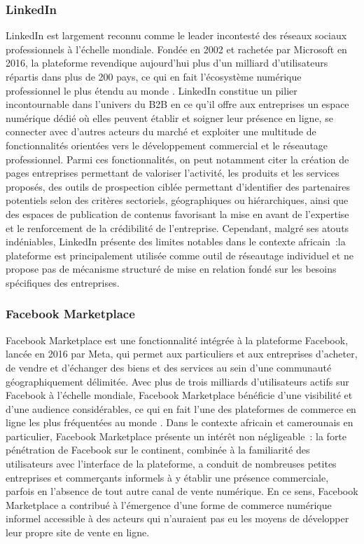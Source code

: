 \documentclass[12pt, a4paper, oneside]{report}
\begin{document}
\subsubsection{LinkedIn}

LinkedIn est largement reconnu comme le leader incontesté des réseaux
sociaux professionnels à l'échelle mondiale. Fondée en 2002 et rachetée
par Microsoft en 2016, la plateforme revendique aujourd'hui plus d'un
milliard d'utilisateurs répartis dans plus de 200 pays, ce qui en fait
l'écosystème numérique professionnel le plus étendu au monde \cite{linkedin2024}. LinkedIn
constitue un pilier incontournable dans l'univers du B2B en ce qu'il
offre aux entreprises un espace numérique dédié où elles peuvent établir
et soigner leur présence en ligne, se connecter avec d'autres acteurs
du marché et exploiter une multitude de fonctionnalités orientées vers
le développement commercial et le réseautage professionnel. Parmi ces
fonctionnalités, on peut notamment citer la création de pages entreprises
permettant de valoriser l'activité, les produits et les services proposés,
des outils de prospection ciblée permettant d'identifier des partenaires
potentiels selon des critères sectoriels, géographiques ou hiérarchiques,
ainsi que des espaces de publication de contenus favorisant la mise en
avant de l'expertise et le renforcement de la crédibilité de l'entreprise.
Cependant, malgré ses atouts indéniables, LinkedIn présente des limites
notables dans le contexte africain~:la
plateforme est principalement utilisée comme outil de réseautage
individuel et ne propose pas de mécanisme structuré de mise en relation
fondé sur les besoins spécifiques des entreprises.

\subsubsection{Facebook Marketplace}

Facebook Marketplace est une fonctionnalité intégrée à la plateforme
Facebook, lancée en 2016 par Meta, qui permet aux particuliers et aux
entreprises d'acheter, de vendre et d'échanger des biens et des services
au sein d'une communauté géographiquement délimitée. Avec plus de trois
milliards d'utilisateurs actifs sur Facebook à l'échelle mondiale,
Facebook Marketplace bénéficie d'une visibilité et d'une audience considérables,
ce qui en fait l'une des plateformes de commerce en ligne les plus
fréquentées au monde \cite{meta2024}. Dans le contexte africain et camerounais en
particulier, Facebook Marketplace présente un intérêt non négligeable~:
la forte pénétration de Facebook sur le continent, combinée à la
familiarité des utilisateurs avec l'interface de la plateforme, a conduit
de nombreuses petites entreprises et commerçants informels à y établir
une présence commerciale, parfois en l'absence de tout autre canal de
vente numérique. En ce sens, Facebook Marketplace a contribué à
l'émergence d'une forme de commerce numérique informel accessible à des
acteurs qui n'auraient pas eu les moyens de développer leur propre site
de vente en ligne.
\end{document}

